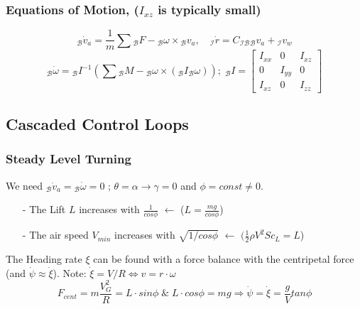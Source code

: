 \documentclass[fontsize=6pt,DIV=calc,a4paper,ngerman]{scrartcl}
\begin{document}
\begin{multicols*}{4}
	\subsubsection{Equations of Motion, ($I_{xz}$ is typically small)}
	$${}_\mathcal{B}\dot{v}_a= \frac{1}{m}\sum{}_\mathcal{B}F - {}_\mathcal{B}\omega \times {}_\mathcal{B}v_a, \quad {}_\mathcal{I}\dot{r}=C_\mathcal{IB} {}_\mathcal{B}v_a+{}_\mathcal{I}v_w$$
	$${}_\mathcal{B}\dot{\omega}={}_\mathcal{B}I^{-1}\left(\sum {}_\mathcal{B}M -{}_\mathcal{B}\omega \times ({}_\mathcal{B}I{}_\mathcal{B}\omega)\right); \; {}_\mathcal{B}I = \left[\begin{smallmatrix}I_{xx} & 0 & I_{xz}\\ 0 & I_{yy} & 0 \\ I_{xz} & 0 & I_{zz}\end{smallmatrix}\right]$$


	\subsection{Cascaded Control Loops}
	\subsubsection{Steady Level Turning}
	We need ${}_\mathcal{B}\dot{v}_a = {}_\mathcal{B}\dot{\omega}=0$ ;  $\theta = \alpha \rightarrow \gamma = 0$ and $\phi = const \neq 0$.

	\begin{itemize}
		\item[-] The Lift $L$ increases with $\frac{1}{cos\phi}$ \quad $\leftarrow$ ($ L = \frac{mg}{cos\phi} $)

		\item[-] The air speed $V_{min}$ increases with $\sqrt{1/cos\phi}$ \quad $\leftarrow$ $(\frac{1}{2}\rho V^2Sc_L = L$)
	\end{itemize}
	The Heading rate $\xi$ can be found with a force balance with the centripetal force (and $\dot{\psi}\approx \dot{\xi}$). Note: $\dot{\xi} = V/R \Leftrightarrow v=r\cdot \omega $
	$$F_{cent}= m\frac{V_{G}^2}{R}= L\cdot sin\phi \; \&\; L\cdot cos\phi = mg \Rightarrow \dot{\psi}= \dot{\xi} = \frac{g}{V}tan\phi$$


\end{multicols*}
\end{document}
